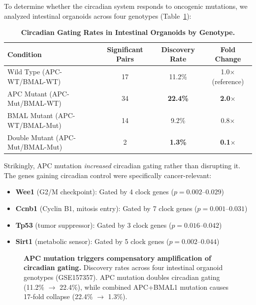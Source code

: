 \documentclass[11pt,a4paper]{article}
\begin{document}
To determine whether the circadian system responds to oncogenic mutations, we analyzed intestinal organoids across four genotypes (Table~\ref{tab:intestinal}):

\begin{table}[H]
\centering
\caption{\textbf{Circadian Gating Rates in Intestinal Organoids by Genotype.}}
\label{tab:intestinal}
\begin{tabular}{lccc}
\toprule
\textbf{Condition} & \textbf{Significant Pairs} & \textbf{Discovery Rate} & \textbf{Fold Change} \\
\midrule
Wild Type (APC-WT/BMAL-WT) & 17 & 11.2\% & 1.0$\times$ (reference) \\
APC Mutant (APC-Mut/BMAL-WT) & 34 & \textbf{22.4\%} & \textbf{2.0$\times$} \\
BMAL Mutant (APC-WT/BMAL-Mut) & 14 & 9.2\% & 0.8$\times$ \\
Double Mutant (APC-Mut/BMAL-Mut) & 2 & \textbf{1.3\%} & \textbf{0.1$\times$} \\
\bottomrule
\end{tabular}
\end{table}

Strikingly, APC mutation \textit{increased} circadian gating rather than disrupting it. The genes gaining circadian control were specifically cancer-relevant:
\begin{itemize}[noitemsep]
    \item \textbf{Wee1} (G2/M checkpoint): Gated by 4 clock genes ($p = 0.002$--$0.029$)
    \item \textbf{Ccnb1} (Cyclin B1, mitosis entry): Gated by 7 clock genes ($p = 0.001$--$0.031$)
    \item \textbf{Tp53} (tumor suppressor): Gated by 3 clock genes ($p = 0.016$--$0.042$)
    \item \textbf{Sirt1} (metabolic sensor): Gated by 5 clock genes ($p = 0.002$--$0.044$)
\end{itemize}

\begin{figure}[H]
\centering
{}
\caption{\textbf{APC mutation triggers compensatory amplification of circadian gating.} Discovery rates across four intestinal organoid genotypes (GSE157357). APC mutation doubles circadian gating (11.2\% $\rightarrow$ 22.4\%), while combined APC+BMAL1 mutation causes 17-fold collapse (22.4\% $\rightarrow$ 1.3\%).}
\label{fig:compensatory}
\end{figure}
\end{document}
